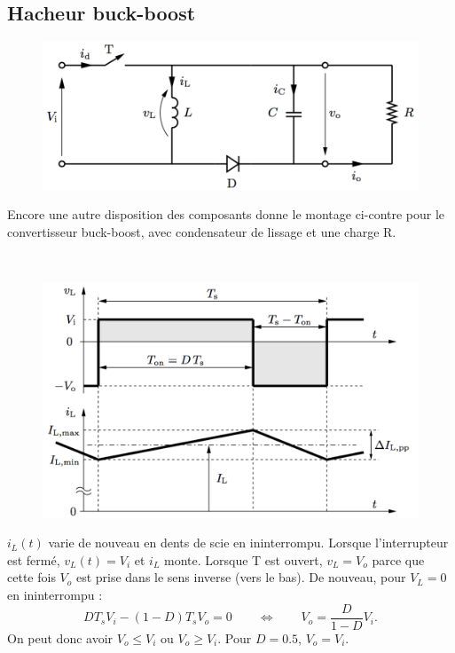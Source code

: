 	\subsection{Hacheur buck-boost}
		\begin{figure}
		\vspace{-16mm}
		\includegraphics[scale=0.3]{ch5/13}
		\end{figure}	
		Encore une autre disposition des composants donne le montage ci-contre pour le convertisseur buck-boost, avec condensateur de lissage et une charge R. 
		
		\ \\
		\begin{figure}
		\vspace{-5mm}
		\includegraphics[scale=0.25]{ch5/14}
		\end{figure}	
		$i_L(t)$ varie de nouveau en dents de scie en ininterrompu. Lorsque l'interrupteur est fermé, $v_L(t) = V_i$ et $i_L$ monte. Lorsque T est ouvert, $v_L = V_o$ parce que cette fois $V_o$ est prise dans le sens inverse (vers le bas). De nouveau, pour $V_L = 0$ en ininterrompu : 
		\begin{equation}
			DT_s V_i - (1-D)T_s V_o = 0 \qquad \Leftrightarrow \qquad V_o = \frac{D}{1-D}V_i.
		\end{equation}
		On peut donc avoir $V_o \leq V_i$ ou $V_o \geq V_i$. Pour $D = 0.5$, $V_o =V_i.$ \\ 
		
